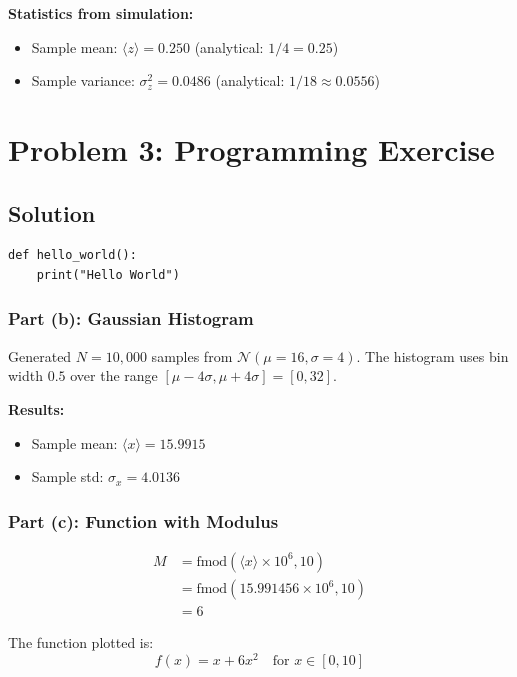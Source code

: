 \documentclass[12pt]{article}
\begin{document}
\textbf{Statistics from simulation:}
\begin{itemize}
    \item Sample mean: $\langle z \rangle = 0.250$ (analytical: $1/4 = 0.25$)
    \item Sample variance: $\sigma_z^2 = 0.0486$ (analytical: $1/18 \approx 0.0556$)
\end{itemize}

\section{Problem 3: Programming Exercise}
\label{sec:problem3}

\subsection*{Solution}
\begin{verbatim}
def hello_world():
    print("Hello World")
\end{verbatim}

\subsubsection*{Part (b): Gaussian Histogram}
Generated $N = 10,000$ samples from $\mathcal{N}(\mu=16, \sigma=4)$. The histogram uses bin width $0.5$ over the range $[\mu - 4\sigma, \mu + 4\sigma] = [0, 32]$.

\textbf{Results:}
\begin{itemize}
    \item Sample mean: $\langle x \rangle = 15.9915$
    \item Sample std: $\sigma_x = 4.0136$
\end{itemize}

\subsubsection*{Part (c): Function with Modulus}
\begin{align}
M &= \text{fmod}(\langle x \rangle \times 10^6, 10) \\
  &= \text{fmod}(15.991456 \times 10^6, 10) \\
  &= 6
\end{align}

The function plotted is:
\begin{equation}
f(x) = x + 6x^2 \quad \text{for } x \in [0, 10]
\end{equation}
\end{document}
